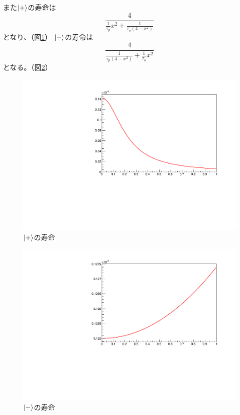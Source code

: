 また$\ket{+}$の寿命は
\begin{equation}
\frac{4}{\frac{1}{\tau_{p}}x^{2}+\frac{1}{\tau_{o}(4-x^{2})}}
\end{equation}
となり、（図\ref{fig:pluslife}）
$\ket{-}$の寿命は
\begin{equation}
\frac{4}{\frac{1}{\tau_{p}(4-x^{2})}+\frac{1}{\tau_{o}}x^{2}}
\end{equation}
となる。（図\ref{fig:minuslife}）

\begin{figure}[H]
\centering
\includegraphics[keepaspectratio,angle=270,scale=0.6]{fig/ybm/pluslife.pdf}
\caption{$\ket{+}$の寿命}
\label{fig:pluslife}
\end{figure}

\begin{figure}[H]
\centering
\includegraphics[keepaspectratio,angle=270,scale=0.6]{fig/ybm/minuslife.pdf}
\caption{$\ket{-}$の寿命}
\label{fig:minuslife}
\end{figure}


